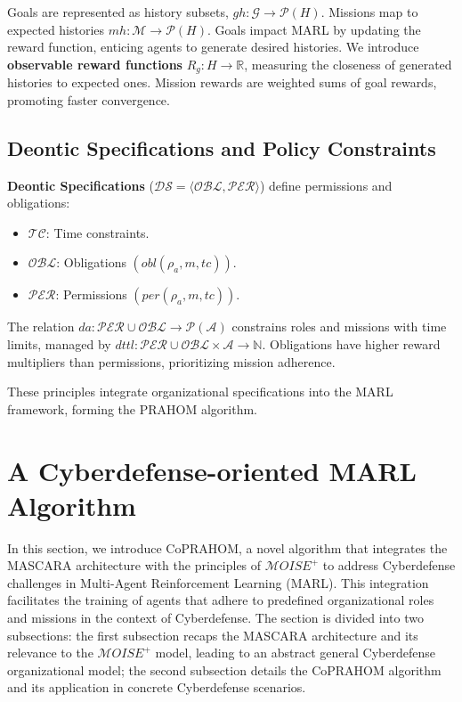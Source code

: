\documentclass[conference]{IEEEtran}
\newcounter{relation}
\begin{document}
Goals are represented as history subsets, $gh: \mathcal{G} \rightarrow \mathcal{P}(H)$. Missions map to expected histories $mh: \mathcal{M} \rightarrow \mathcal{P}(H)$. Goals impact MARL by updating the reward function, enticing agents to generate desired histories. We introduce \textbf{observable reward functions} $R_g: H \rightarrow \mathbb{R}$, measuring the closeness of generated histories to expected ones. Mission rewards are weighted sums of goal rewards, promoting faster convergence.

\subsection{Deontic Specifications and Policy Constraints}

\textbf{Deontic Specifications} ($\mathcal{DS} = \langle \mathcal{OBL}, \mathcal{PER} \rangle$) define permissions and obligations:
\begin{itemize}
    \item $\mathcal{TC}$: Time constraints.
    \item $\mathcal{OBL}$: Obligations $(obl(\rho_a, m, tc))$.
    \item $\mathcal{PER}$: Permissions $(per(\rho_a, m, tc))$.
\end{itemize}

The relation $da: \mathcal{PER} \cup \mathcal{OBL} \rightarrow \mathcal{P}(\mathcal{A})$ constrains roles and missions with time limits, managed by $dttl: \mathcal{PER} \cup \mathcal{OBL} \times \mathcal{A} \rightarrow \mathbb{N}$. Obligations have higher reward multipliers than permissions, prioritizing mission adherence.

These principles integrate organizational specifications into the MARL framework, forming the PRAHOM algorithm.

\section{A Cyberdefense-oriented MARL Algorithm}\label{sec:coprahom}

In this section, we introduce CoPRAHOM, a novel algorithm that integrates the MASCARA architecture with the principles of $\mathcal{M}OISE^+$ to address Cyberdefense challenges in Multi-Agent Reinforcement Learning (MARL). This integration facilitates the training of agents that adhere to predefined organizational roles and missions in the context of Cyberdefense. The section is divided into two subsections: the first subsection recaps the MASCARA architecture and its relevance to the $\mathcal{M}OISE^+$ model, leading to an abstract general Cyberdefense organizational model; the second subsection details the CoPRAHOM algorithm and its application in concrete Cyberdefense scenarios.
\end{document}
